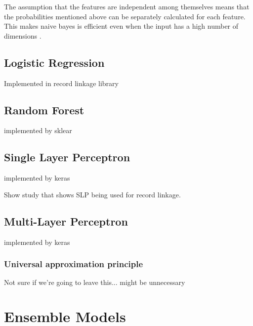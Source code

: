 \documentclass[epsfig,a4paper,11pt,titlepage,twoside,openany]{book}
\begin{document}
The assumption that the features are independent among themselves means that the probabilities mentioned above can be separately calculated for each feature. This makes naive bayes is efficient even when the input has a high number of dimensions \cite{zhang2004_bayes_optimality}.



\subsection{Logistic Regression}
\label{sec:clf-lr}

Implemented in record linkage library \cite{recordlinkage-library}


\subsection{Random Forest}
\label{sec:clf-rgc}

implemented by sklear \cite{scikit-learn}

\subsection{Single Layer Perceptron}
\label{sec:clf-slp}

implemented by keras \cite{chollet2015keras}

Show study that shows SLP being used for record linkage. 


\subsection{Multi-Layer Perceptron}
\label{sec:clf-mlp}

implemented by keras \cite{chollet2015keras}

\subsubsection{Universal approximation principle}
\label{sec:universal-apprx-principle}

Not sure if we're going to leave this... might be unnecessary



\section{Ensemble Models}
\label{sec:ensemble-models}
\end{document}
